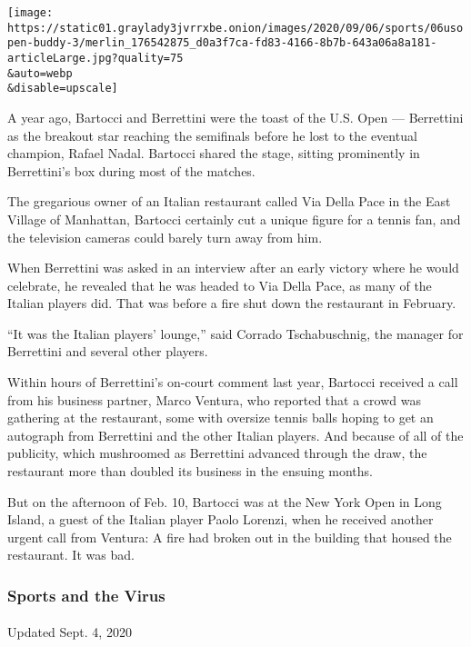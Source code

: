 \texttt{[image: https://static01.graylady3jvrrxbe.onion/images/2020/09/06/sports/06usopen-buddy-3/merlin\_176542875\_d0a3f7ca-fd83-4166-8b7b-643a06a8a181-articleLarge.jpg?quality=75\\\&auto=webp\\\&disable=upscale]}

A year ago, Bartocci and Berrettini were the toast of the U.S. Open ---
Berrettini as the breakout star reaching the semifinals before he lost
to the eventual champion, Rafael Nadal. Bartocci shared the stage,
sitting prominently in Berrettini's box during most of the matches.

The gregarious owner of an Italian restaurant called Via Della Pace in
the East Village of Manhattan, Bartocci certainly cut a unique figure
for a tennis fan, and the television cameras could barely turn away from
him.

When Berrettini was asked in an interview after an early victory where
he would celebrate, he revealed that he was headed to Via Della Pace, as
many of the Italian players did. That was before a fire shut down the
restaurant in February.

``It was the Italian players' lounge,'' said Corrado Tschabuschnig, the
manager for Berrettini and several other players.

Within hours of Berrettini's on-court comment last year, Bartocci
received a call from his business partner, Marco Ventura, who reported
that a crowd was gathering at the restaurant, some with oversize tennis
balls hoping to get an autograph from Berrettini and the other Italian
players. And because of all of the publicity, which mushroomed as
Berrettini advanced through the draw, the restaurant more than doubled
its business in the ensuing months.

But on the afternoon of Feb. 10, Bartocci was at the New York Open in
Long Island, a guest of the Italian player Paolo Lorenzi, when he
received another urgent call from Ventura: A fire had broken out in the
building that housed the restaurant. It was bad.

\hypertarget{sports-and-the-virus}{%
\subsubsection{Sports and the Virus}\label{sports-and-the-virus}}

\paragraph{}

Updated Sept. 4, 2020

